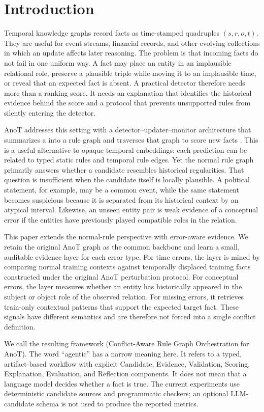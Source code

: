 \section{Introduction}

Temporal knowledge graphs record facts as time-stamped quadruples $(s,r,o,t)$. They are useful for event streams, financial records, and other evolving collections in which an update affects later reasoning. The problem is that incoming facts do not fail in one uniform way. A fact may place an entity in an implausible relational role, preserve a plausible triple while moving it to an implausible time, or reveal that an expected fact is absent. A practical detector therefore needs more than a ranking score. It needs an explanation that identifies the historical evidence behind the score and a protocol that prevents unsupported rules from silently entering the detector.

AnoT addresses this setting with a detector--updater--monitor architecture that summarizes a \tkg into a rule graph and traverses that graph to score new facts \cite{Zhang_2024}. This is a useful alternative to opaque temporal embeddings: each prediction can be related to typed static rules and temporal rule edges. Yet the normal rule graph primarily answers whether a candidate resembles historical regularities. That question is insufficient when the candidate itself is locally plausible. A political statement, for example, may be a common event, while the same statement becomes suspicious because it is separated from its historical context by an atypical interval. Likewise, an unseen entity pair is weak evidence of a conceptual error if the entities have previously played compatible roles in the relation.

This paper extends the normal-rule perspective with error-aware evidence. We retain the original AnoT graph as the common backbone and learn a small, auditable evidence layer for each error type. For time errors, the layer is mined by comparing normal training contexts against temporally displaced training facts constructed under the original AnoT perturbation protocol. For conceptual errors, the layer measures whether an entity has historically appeared in the subject or object role of the observed relation. For missing errors, it retrieves train-only contextual patterns that support the expected target fact. These signals have different semantics and are therefore not forced into a single conflict definition.

We call the resulting framework \method (Conflict-Aware Rule Graph Orchestration for AnoT). The word ``agentic'' has a narrow meaning here. It refers to a typed, artifact-based workflow with explicit Candidate, Evidence, Validation, Scoring, Explanation, Evaluation, and Reflection components. It does not mean that a language model decides whether a fact is true. The current experiments use deterministic candidate sources and programmatic checkers; an optional LLM-candidate schema is not used to produce the reported metrics.

